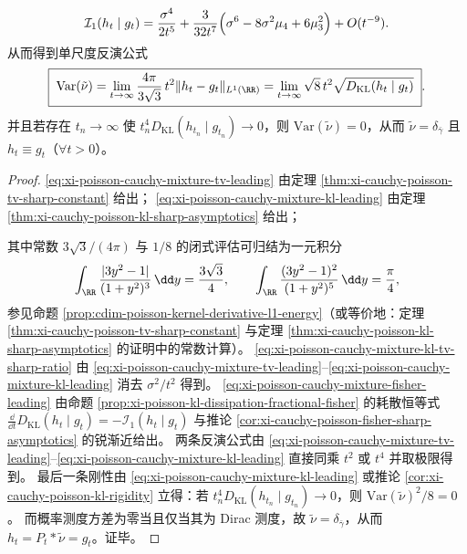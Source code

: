 \begin{corollary}
\begin{equation}
\mathcal I_1(h_t\mid g_t)=\frac{\sigma^4}{2t^5}
+\frac{3}{32t^7}\Bigl(\sigma^6-8\sigma^2\mu_4+6\mu_3^2\Bigr)
+O(t^{-9}).
\end{equation}
从而得到单尺度反演公式
\begin{equation}\label{eq:xi-poisson-cauchy-mixture-variance-inversion}
\boxed{\;
\mathrm{Var}(\tilde\nu)
=\lim_{t\to\infty}\frac{4\pi}{3\sqrt3}\,t^2\|h_t-g_t\|_{L^1(\RR)}
=\lim_{t\to\infty}\sqrt{8}\,t^2\sqrt{D_{\mathrm{KL}}(h_t\mid g_t)}\; }.
\end{equation}
并且若存在 \(t_n\to\infty\) 使 \(t_n^4D_{\mathrm{KL}}(h_{t_n}\mid g_{t_n})\to 0\)，则 \(\mathrm{Var}(\tilde\nu)=0\)，从而 \(\tilde\nu=\delta_{\bar\gamma}\) 且 \(h_t\equiv g_t\)（\(\forall t>0\)）。
\end{corollary}

\begin{proof}
\eqref{eq:xi-poisson-cauchy-mixture-tv-leading} 由定理 \ref{thm:xi-cauchy-poisson-tv-sharp-constant} 给出；
\eqref{eq:xi-poisson-cauchy-mixture-kl-leading} 由定理 \ref{thm:xi-cauchy-poisson-kl-sharp-asymptotics} 给出；
\par
其中常数 \(3\sqrt3/(4\pi)\) 与 \(1/8\) 的闭式评估可归结为一元积分
\[
\int_{\RR}\frac{|3y^2-1|}{(1+y^2)^3}\,\dd y=\frac{3\sqrt3}{4},
\qquad
\int_{\RR}\frac{(3y^2-1)^2}{(1+y^2)^5}\,\dd y=\frac{\pi}{4},
\]
参见命题 \ref{prop:cdim-poisson-kernel-derivative-l1-energy}（或等价地：定理 \ref{thm:xi-cauchy-poisson-tv-sharp-constant} 与定理 \ref{thm:xi-cauchy-poisson-kl-sharp-asymptotics} 的证明中的常数计算）。
\eqref{eq:xi-poisson-cauchy-mixture-kl-tv-sharp-ratio} 由 \eqref{eq:xi-poisson-cauchy-mixture-tv-leading}--\eqref{eq:xi-poisson-cauchy-mixture-kl-leading} 消去 \(\sigma^2/t^2\) 得到。
\eqref{eq:xi-poisson-cauchy-mixture-fisher-leading} 由命题 \ref{prop:xi-poisson-kl-dissipation-fractional-fisher} 的耗散恒等式
\(
\frac{\dd}{\dd t}D_{\mathrm{KL}}(h_t\mid g_t)=-\mathcal I_1(h_t\mid g_t)
\)
与推论 \ref{cor:xi-cauchy-poisson-fisher-sharp-asymptotics} 的锐渐近给出。
两条反演公式由 \eqref{eq:xi-poisson-cauchy-mixture-tv-leading}--\eqref{eq:xi-poisson-cauchy-mixture-kl-leading} 直接同乘 \(t^2\) 或 \(t^4\) 并取极限得到。
最后一条刚性由 \eqref{eq:xi-poisson-cauchy-mixture-kl-leading} 或推论 \ref{cor:xi-cauchy-poisson-kl-rigidity} 立得：若 \(t_n^4D_{\mathrm{KL}}(h_{t_n}\mid g_{t_n})\to 0\)，则 \(\mathrm{Var}(\tilde\nu)^2/8=0\)。
而概率测度方差为零当且仅当其为 Dirac 测度，故 \(\tilde\nu=\delta_{\bar\gamma}\)，从而 \(h_t=P_t*\tilde\nu=g_t\)。证毕。
\end{proof}





